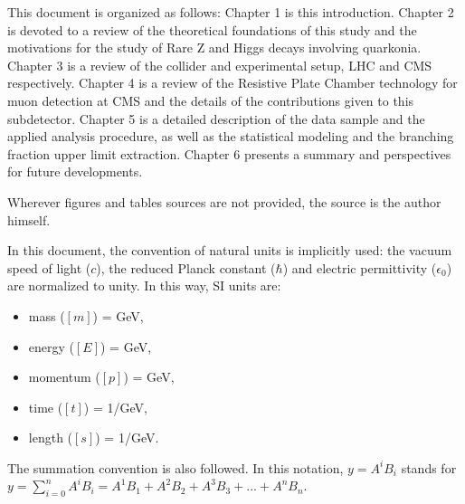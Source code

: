 This document is organized as follows: Chapter 1 is this introduction. Chapter 2 is devoted to a review of the theoretical foundations of this study and the motivations for the study of Rare Z and Higgs decays involving quarkonia. Chapter 3 is a review of the collider and experimental setup, LHC and CMS respectively. Chapter 4 is a review of the Resistive Plate Chamber technology for muon detection at CMS and the details of the contributions given to this subdetector. Chapter 5 is a detailed description of the data sample and the applied analysis procedure, as well as the statistical modeling and the branching fraction upper limit extraction. Chapter 6 presents a summary and perspectives for future developments.

Wherever figures and tables sources are not provided, the source is the author himself.

In this document, the convention of natural units is implicitly used: the vacuum speed of light ($c$), the reduced Planck constant ($\hbar$) and electric permittivity ($\epsilon_{0}$) are normalized to unity. In this way, SI units are:
\begin{itemize}
    \setlength\itemsep{-0.5em}
    \item mass ($[m]$) = GeV,
    \item energy ($[E]$) = GeV,
    \item momentum ($[p]$) = GeV,
    \item time ($[t]$) = 1/GeV,
    \item length ($[s]$) = 1/GeV.
\end{itemize}

The summation convention is also followed. In this notation, $y = A^i B_i$ stands for $y = \sum_{i=0}^n A^i B_i = A^1 B_1 + A^2 B_2 + A^3 B_3 + ... + A^n B_n$.